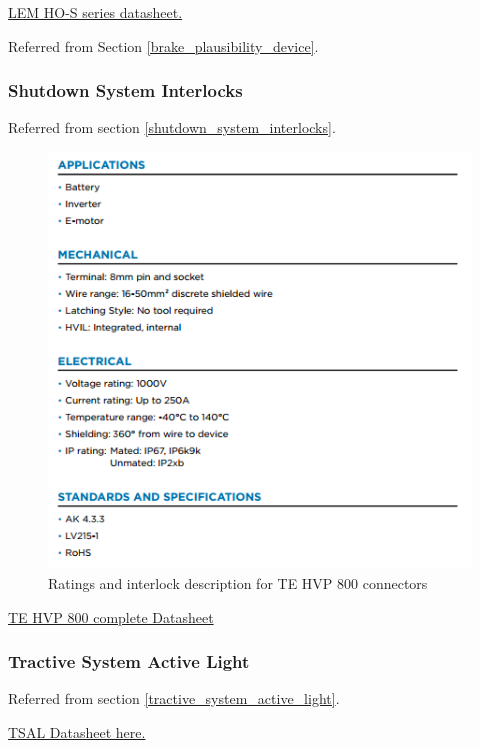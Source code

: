 \documentclass{article}
\begin{document}
\href{http://www.lem.com/docs/products/ho_50_250-s-0100_series.pdf}{LEM HO-S series datasheet.}

Referred from Section \ref{brake_plausibility_device}.

\setcounter{subsubsection}{5}
\subsubsection{Shutdown System Interlocks}\label{sec:appendix_interlocks}
Referred from section \ref{shutdown_system_interlocks}.

\begin{figure}[H]
	\includegraphics[width=.7 \linewidth]{HVP_800_ratings.png}
	\caption{Ratings and interlock description for TE HVP 800 connectors}
	\label{fig:hvp_800_ratings}
\end{figure}
\href{http://www.te.com/content/dam/te-com/documents/hybrid-and-electric-mobility-solutions/global/8-1773462-1-hvp-800.pdf}{TE HVP 800 complete Datasheet}

\hypertarget{TSALdatasheet}{}\label{sec:appendix_TSAL}
\subsubsection{Tractive System Active Light}
Referred from section \ref{tractive_system_active_light}.

\href{https://d114hh0cykhyb0.cloudfront.net/pdfs/MSTRB-X-X+Mini+Strobe+LED.pdf}{TSAL Datasheet here.}
\end{document}
